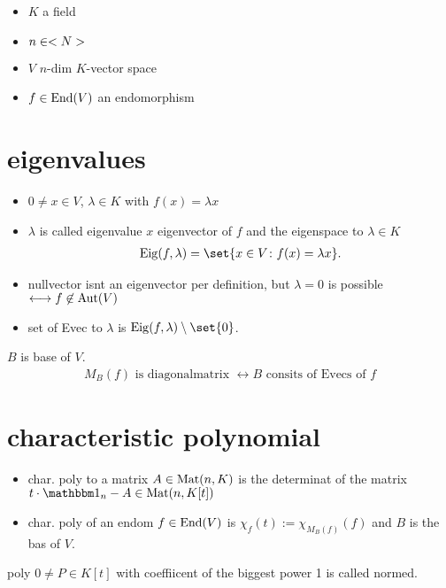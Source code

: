 \begin{itemize}
	\item $K$ a field
	\item $n \in <N>$
	\item $V$ $n$-dim $K$-vector space
	\item $f \in \operatorname{End}(V)$ an endomorphism
\end{itemize}
\section{eigenvalues}
\begin{definition}
	\begin{itemize}
		\item $0\neq x \in V$, $\lambda \in K$ with $f(x) = \lambda x$
		\item $\lambda$ is called eigenvalue $x$ eigenvector of $f$ and the eigenspace to $\lambda \in K$ 
		\begin{align*}
			\Eig(f,\lambda) = \set{x \in V \colon f(x) = \lambda x}.
		\end{align*} 
	\end{itemize}
\end{definition}
\begin{*remark}
	\begin{itemize}
		\item nullvector isnt an eigenvector per definition, but $\lambda = 0$ is possible $\longleftrightarrow f \not \in \operatorname{Aut}(V)$
		\item set of Evec to $\lambda$ is $\Eig(f,\lambda)\setminus \set{0}$.
	\end{itemize}
\end{*remark}
\begin{proposition}
	$B$ is base of $V$.\\
	\begin{align*}
		M_B(f) \text{ is diagonalmatrix } \longleftrightarrow B \text{ consits of Evecs of }f
	\end{align*}
\end{proposition}
\begin{lemma}
	
\end{lemma}
\section{characteristic polynomial}
\begin{definition}
	\begin{itemize}
		\item char. poly to a matrix $A \in \operatorname{Mat}(n,K)$ is the determinat of the matrix $t\mal \indi_n - A \in \Mat(n,K[t])$
		\item char. poly of an endom $f \in \operatorname{End}(V)$ is $\chi_f(t) := \chi_{M_B(f)}(f)$ and $B$ is the bas of $V$.
	\end{itemize}
\end{definition}
\begin{definition}
	poly $0 \neq P \in K[t]$ with coeffiicent of the biggest power 1 is called normed.
\end{definition}
